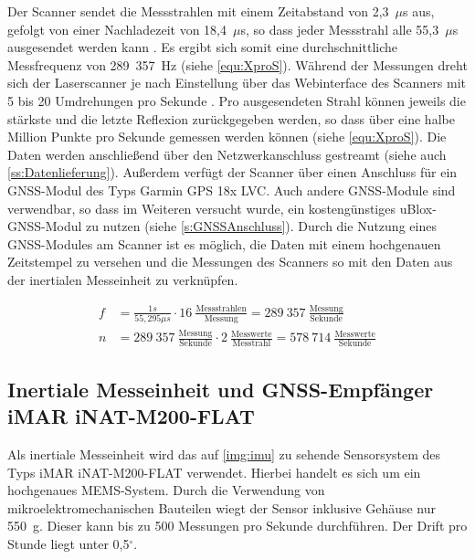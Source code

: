 \documentclass[a4paper,12pt,bibliography=totoc, listof=totoc,titlepage,pointlessnumbers]{scrreprt}
\begin{document}
Der Scanner sendet die Messstrahlen mit einem Zeitabstand von 2,3~$\mu$s aus, gefolgt von einer Nachladezeit von 18,4~$\mu$s, so dass jeder Messstrahl alle 55,3~$\mu$s ausgesendet werden kann \citep[S. 16]{vlpManual}. Es ergibt sich somit eine durchschnittliche Messfrequenz von 289~357~Hz (siehe \autoref{equ:XproS}). Während der Messungen dreht sich der Laser\-scan\-ner je nach Einstellung über das Webinterface des Scanners mit 5 bis 20 Umdrehungen pro Sekunde \citep{vlpSheet}. Pro ausgesendeten Strahl können jeweils die stärkste und die letzte Reflexion zurückgegeben werden, so dass über eine halbe Million Punkte pro Sekunde gemessen werden können (siehe \autoref{equ:XproS}). Die Daten werden anschließend über den Netzwerkanschluss gestreamt (siehe auch \autoref{ss:Datenlieferung}). Außerdem verfügt der Scanner über einen Anschluss für ein GNSS-Modul des Typs Garmin GPS 18x LVC. Auch andere GNSS-Module sind verwendbar, so dass im Weiteren versucht wurde, ein kostengünstiges uBlox-GNSS-Modul zu nutzen (siehe \autoref{s:GNSSAnschluss}). Durch die Nutzung eines GNSS-Modules am Scanner ist es möglich, die Daten mit einem hochgenauen Zeitstempel zu versehen und die Messungen des Scanners so mit den Daten aus der inertialen Messeinheit zu verknüpfen.

\begin{equation}
 \label{equ:XproS}
 \begin{aligned}
  f &= \frac{1s}{55,295\mu s} \cdot 16~\frac{\text{Messstrahlen}}{\text{Messung}} = 289~357~\frac{\text{Messung}}{\text{Sekunde}} \\
  n &= 289~357~\frac{\text{Messung}}{\text{Sekunde}} \cdot 2~\frac{\text{Messwerte}}{\text{Messtrahl}} = 578~714~\frac{\text{Messwerte}}{\text{Sekunde}}
 \end{aligned}
\end{equation}

\subsection{Inertiale Messeinheit und GNSS-Empfänger iMAR iNAT-M200-FLAT}
\label{s:iMar}
Als inertiale Messeinheit wird das auf \autoref{img:imu} zu sehende Sensorsystem des Typs iMAR iNAT-M200-FLAT verwendet. Hierbei handelt es sich um ein hochgenaues MEMS-System. Durch die Verwendung von mikroelektromechanischen Bauteilen wiegt der Sensor inklusive Gehäuse nur 550~g. Dieser kann bis zu 500 Messungen pro Sekunde durchführen. Der Drift pro Stunde liegt unter 0,5\(^\circ\). \citep{imar}
\end{document}
